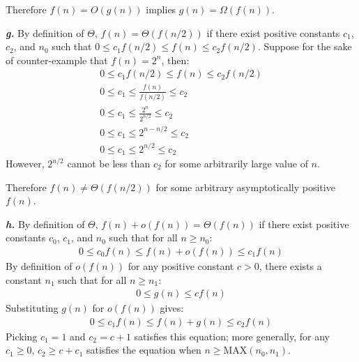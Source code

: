 \documentclass{article}
\begin{document}
Therefore $f(n) = O(g(n))$ implies $g(n) = \Omega(f(n))$.

\noindent\textbf{\textit{g.}} By definition of $\Theta$, $f(n) = \Theta(f(n/2))$ if there exist positive constants $c_1$, $c_2$, and $n_0$ such that $0 \leq c_1 f(n/2) \leq f(n) \leq c_2 f(n/2)$. Suppose for the sake of counter-example that $f(n) = 2^n$, then:
\begin{eqnarray*}
	0 \leq c_1 f(n/2) \leq f(n) \leq c_2 f(n/2) \\
	0 \leq c_1 \leq \frac{f(n)}{f(n/2)} \leq c_2 \\
	0 \leq c_1 \leq \frac{2^n}{2^{n/2}} \leq c_2 \\
	0 \leq c_1 \leq 2^{n - n/2} \leq c_2 \\
	0 \leq c_1 \leq 2^{n/2} \leq c_2
\end{eqnarray*}
However, $2^{n/2}$ cannot be less than $c_2$ for some arbitrarily large value of $n$.

Therefore $f(n) \neq \Theta(f(n/2))$ for some arbitrary asymptotically positive $f(n)$.

\noindent\textbf{\textit{h.}} By definition of $\Theta$, $f(n) + o(f(n)) = \Theta(f(n))$ if there exist positive constants $c_0$, $c_1$, and $n_0$ such that for all $n \geq n_0$:
\begin{eqnarray*}
	0 \leq c_0 f(n) \leq f(n) + o(f(n)) \leq c_1 f(n)
\end{eqnarray*}
By definition of $o(f(n))$ for any positive constant $c > 0$, there exists a constant $n_1$ such that for all $n \geq n_1$:
\begin{eqnarray*}
	0 \leq g(n) \leq cf(n)
\end{eqnarray*}
Substituting $g(n)$ for $o(f(n))$ gives:
\begin{eqnarray*}
	0 \leq c_1 f(n) \leq f(n) + g(n) \leq c_2 f(n)
\end{eqnarray*}
Picking $c_1 = 1$ and $c_2 = c + 1$ satisfies this equation; more generally, for any $c_1 \geq 0$, $c_2 \geq c + c_1$ satisfies the equation when $n \geq \text{MAX}(n_0, n_1)$.
\end{document}
